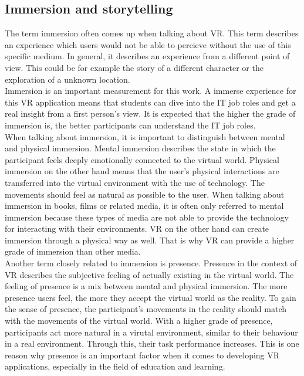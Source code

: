 \subsection{Immersion and storytelling}\label{immersion}
The term immersion often comes up when talking about VR. This term describes an experience which users would not be able to percieve without the use of this specific medium. In general, it describes an experience from a different point of view. This could be for example the story of a different character or the exploration of a unknown location. \cite{Tham.2018} \\ Immersion is an important measurement for this work. A immerse experience for this VR application means that students can dive into the IT job roles and get a real insight from a first person's view. It is expected that the higher the grade of immersion is, the better participants can understand the IT job roles.\\
When talking about immersion, it is important to distinguish between  mental and physical immersion. Mental immersion describes the state in which the participant feels deeply emotionally connected to the virtual world. Physical immersion on the other hand means that the user's physical interactions are transferred into the virtual environment with the use of technology. The movements should feel as natural as possible to the user. When talking about immersion in books, films or related media, it is often only referred to mental immersion because these types of media are not able to provide the technology for interacting with their environments. VR on the other hand can create immersion through a physical way as well. That is why VR can provide a higher grade of immersion than other media. \cite{Tham.2018}\\
Another term closely related to immersion is presence. Presence in the context of VR describes the subjective feeling of actually existing in the virtual world. The feeling of presence is a mix between mental and physical immersion. The more presence users feel, the more they accept the virtual world as the reality. To gain the sense of presence, the participant's movements in the reality should match with the movements of the virtual world.
 With a higher grade of presence, participants act more natural in a virutal environment, similar to their behaviour in a real environment. Through this, their task performance increases. This is one reason why presence is an important factor when it comes to developing VR applications, especially in the field of education and learning. \cite{Slater.1997}

